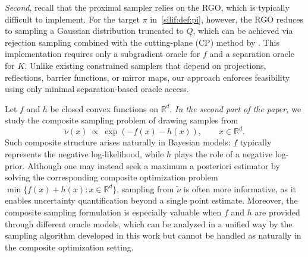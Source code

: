 \documentclass[11pt,letterpaper]{article}
\newcommand{\R}{\mathbb{R}}
\begin{document}
\textit{Second}, recall that the proximal sampler relies on the RGO, which is typically difficult to implement. For the target $\pi$ in~\eqref{silif:def:pi}, however, the RGO reduces to sampling a Gaussian distribution truncated to $Q$, which can be achieved via rejection sampling combined with the cutting-plane (CP) method by \cite{jiang2020cuttingplane}. This implementation requires only a subgradient oracle for $f$ and a separation oracle for $K$. Unlike existing constrained samplers that depend on
projections, reflections, barrier functions, or mirror maps, 
our approach enforces feasibility using only minimal separation-based oracle access.

Let $f$ and $h$ be closed convex functions on $\R^d$.    \emph{In the second part of the paper,} we study the composite sampling problem of drawing samples from
\begin{equation}
\label{dolif:def:nu}
    \tilde{\nu}(x)\ \propto\ \exp \left(-f(x)-h(x)\right), \qquad x\in\R^d.
\end{equation}
Such composite structure arises naturally in Bayesian models: $f$ typically represents the negative log-likelihood, while $h$ plays the role of a negative log-prior. Although one may instead seek a maximum a posteriori estimator by solving the corresponding composite optimization problem $\min\{f(x)+h(x):x\in \R^d\}$, sampling from $\tilde \nu$ is often more informative, as it enables uncertainty quantification beyond a single point estimate. 
Moreover, the composite sampling formulation is especially valuable when $f$ and $h$ are provided through different oracle models, which can be analyzed in a unified way by the sampling algorithm developed in this work but cannot be handled as naturally in the composite optimization setting.
\end{document}
